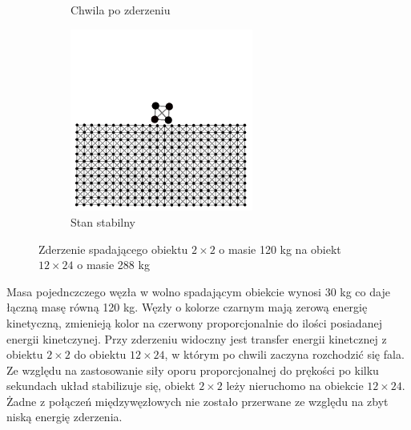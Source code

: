 \documentclass[12pt, letterpaper]{report}
\begin{document}
\begin{figure}[h]
\begin{subfigure}{0.5\textwidth}
            \caption{Chwila po zderzeniu}
        \end{subfigure}
        \begin{subfigure}{0.5\textwidth}
            \centering
            \includegraphics[width=6cm, height=6cm]{collision_2x2_24x12_mass30_4}
            \caption{Stan stabilny}
        \end{subfigure}
        
        \caption{Zderzenie spadającego obiektu $2 \times 2$ o masie 120 kg na obiekt $12 \times 24$ o masie 288 kg}
    \end{figure}
    Masa pojednczczego węzła w wolno spadającym obiekcie wynosi 30 kg co daje łączną masę równą 120 kg.
    Węzły o kolorze czarnym mają zerową energię kinetyczną, 
    zmienieją kolor na czerwony proporcjonalnie do ilości posiadanej energii kinetczynej. 
    Przy zderzeniu widoczny jest transfer energii kinetcznej z obiektu $2 \times 2$ do obiektu $12 \times 24$, 
    w którym po chwili zaczyna rozchodzić się fala. Ze względu na zastosowanie siły oporu proporcjonalnej do prękości
    po kilku sekundach układ stabilizuje się, obiekt $2 \times 2$ leży nieruchomo na obiekcie $12 \times 24$. 
    Żadne z połączeń międzywęzłowych nie zostało przerwane ze względu na zbyt niską energię zderzenia.

    \newpage
\end{document}
